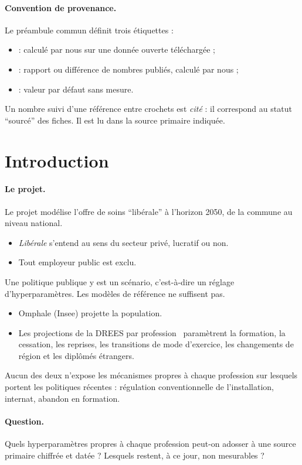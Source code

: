 \documentclass[11pt]{article}
\begin{document}
\paragraph{Convention de provenance.}
Le préambule commun définit trois étiquettes :
\begin{itemize}
\item \mesure{} : calculé par nous sur une donnée ouverte téléchargée ;
\item \derive{} : rapport ou différence de nombres publiés, calculé par nous ;
\item \suppose{} : valeur par défaut sans mesure.
\end{itemize}
Un nombre suivi d'une référence entre crochets est \emph{cité} : il
correspond au statut \enquote{sourcé} des fiches. Il est lu dans la source
primaire indiquée.

\section{Introduction}

\paragraph{Le projet.}
Le projet modélise l'offre de soins \enquote{libérale} à l'horizon 2050, de
la commune au niveau national.
\begin{itemize}
\item \emph{Libérale} s'entend au sens du secteur privé, lucratif ou non.
\item Tout employeur public est exclu.
\end{itemize}
Une politique publique y est un scénario, c'est-à-dire un réglage
d'hyperparamètres. Les modèles de référence ne suffisent pas.
\begin{itemize}
\item Omphale (Insee) projette la population.
\item Les projections de la DREES par profession~\cite{dd76,er1062,er1075,er1319}
  paramètrent la formation, la cessation, les reprises, les transitions de
  mode d'exercice, les changements de région et les diplômés étrangers.
\end{itemize}
Aucun des deux n'expose les mécanismes propres à chaque profession sur
lesquels portent les politiques récentes : régulation conventionnelle de
l'installation, internat, abandon en formation.

\paragraph{Question.}
Quels hyperparamètres propres à chaque profession peut-on adosser à une
source primaire chiffrée et datée ? Lesquels restent, à ce jour, non
mesurables ?
\end{document}
